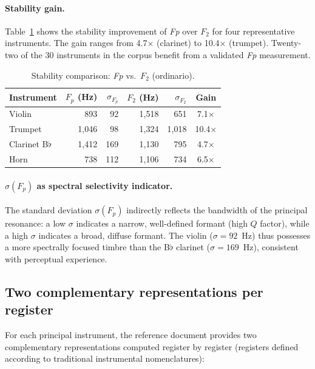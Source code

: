 \documentclass[12pt,a4paper]{article}
\begin{document}
\paragraph{Stability gain.}
Table~\ref{tab:fp_stability} shows the stability improvement of \textit{Fp}
over $F_2$ for four representative instruments. The gain ranges from
4.7$\times$ (clarinet) to 10.4$\times$ (trumpet). Twenty-two of the
30 instruments in the corpus benefit from a validated \textit{Fp} measurement.

\begin{table}[htbp]
\centering
\caption{Stability comparison: \textit{Fp} vs.\ $F_2$ (ordinario).}
\label{tab:fp_stability}
\begin{tabular}{lrrrrc}
\toprule
Instrument & $F_p$ (Hz) & $\sigma_{F_p}$ & $F_2$ (Hz) & $\sigma_{F_2}$ & Gain \\
\midrule
Violin     & 893  & 92  & 1,518 & 651   & 7.1$\times$ \\
Trumpet    & 1,046 & 98  & 1,324 & 1,018 & 10.4$\times$ \\
Clarinet B$\flat$ & 1,412 & 169 & 1,130 & 795 & 4.7$\times$ \\
Horn       & 738  & 112 & 1,106 & 734   & 6.5$\times$ \\
\bottomrule
\end{tabular}
\end{table}

\paragraph{$\sigma(F_p)$ as spectral selectivity indicator.}
The standard deviation $\sigma(F_p)$ indirectly reflects the bandwidth of the
principal resonance: a low $\sigma$ indicates a narrow, well-defined formant
(high $Q$ factor), while a high $\sigma$ indicates a broad, diffuse formant.
The violin ($\sigma = 92$~Hz) thus possesses a more spectrally focused timbre
than the B$\flat$ clarinet ($\sigma = 169$~Hz), consistent with perceptual
experience.

\subsection{Two complementary representations per register}

For each principal instrument, the reference document provides two
complementary representations computed register by register (registers defined
according to traditional instrumental nomenclatures):
\end{document}
